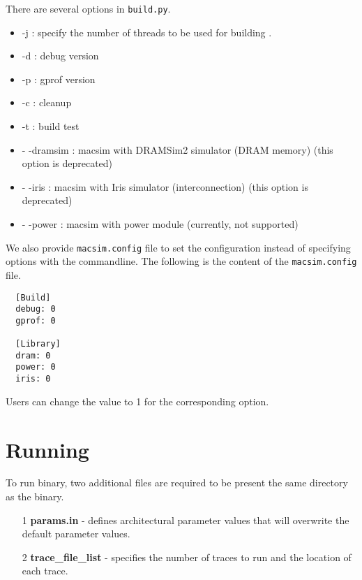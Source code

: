There are several options in \Verb+build.py+.

\begin{itemize}
  \item -j : specify the number of threads to be used for building \SIM.
  \item -d : debug version
  \item -p : gprof version
  \item -c : cleanup
  \item -t : build test
  \item - -dramsim : macsim with DRAMSim2 simulator (DRAM memory)
    (this option is deprecated)
  \item - -iris : macsim with Iris simulator (interconnection)  (this option is deprecated)
 
  \item - -power : macsim with power module (currently, not supported) 
\end{itemize}

\noindent
We also provide \Verb+macsim.config+ file to set the configuration instead of 
specifying options with the commandline. The following is the content of the 
\Verb+macsim.config+ file.

  \begin{Verbatim}
  [Build]
  debug: 0
  gprof: 0

  [Library]
  dram: 0
  power: 0
  iris: 0
  \end{Verbatim}

\noindent
Users can change the value to 1 for the corresponding option.

\section{Running \SIM}
\label{sec:run}

To run \bin binary, two additional files are required to be present 
the same directory as the binary.

\begin{itemize}
  \item[1] \textbf{params.in} - defines architectural parameter values that will
  overwrite the default parameter values.

  \item[2] \textbf{trace\_file\_list} - specifies the number of traces to run and
  the location of each trace.
\end{itemize}


